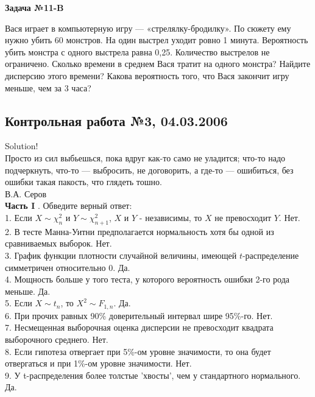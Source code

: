 \documentclass[12pt, a4paper]{article}\usepackage[]{graphicx}\usepackage[]{color}
\begin{document}
{\bf Задача №}{\bf 11}{\bf -}{\bf B}

Вася играет в компьютерную игру — «стрелялку-бродилку». По сюжету ему нужно убить 60 монстров. На один выстрел уходит ровно 1 минута. Вероятность убить монстра с одного выстрела равна 0,25. Количество выстрелов не ограничено. Сколько времени в среднем Вася тратит на одного монстра? Найдите дисперсию этого времени? Какова вероятность того, что Вася закончит игру меньше, чем за 3 часа?

\subsection{Контрольная работа №3, 04.03.2006}


Solution! \\

Просто из сил выбьешься, пока вдруг как-то само не уладится;
что-то надо подчеркнуть, что-то — выбросить, не договорить, а
где-то — ошибиться, без ошибки такая пакость, что глядеть тошно. \\
В.А. Серов \\


{\bf Часть I }. Обведите верный ответ: \\

1. Если $X\sim \chi_{n}^{2}$ и $Y\sim \chi_{n+1}^{2}$, $X$ и $Y$ -
независимы, то  $X$ не превосходит $Y$. Нет.  \\

2. В тесте Манна-Уитни предполагается нормальность хотя бы одной
из сравниваемых выборок. Нет. \\

3. График функции плотности случайной величины, имеющей
$t$-распределение симметричен относительно 0. Да.  \\
4. Мощность больше у того теста, у которого вероятность ошибки
2-го рода меньше. Да.  \\

5. Если $X\sim t_{n}$, то $X^{2}\sim F_{1,n}$. Да.\\
6. При прочих равных 90\% доверительный интервал шире 95\%-го.  Нет. \\
7. Несмещенная выборочная оценка дисперсии не превосходит квадрата
выборочного среднего. Нет. \\

8. Если гипотеза отвергает при 5\%-ом уровне значимости, то она
будет отвергаться и при 1\%-ом уровне значимости. Нет. \\

9. У t-распределения более толстые 'хвосты', чем у стандартного
нормального. Да.  \\
\end{document}
